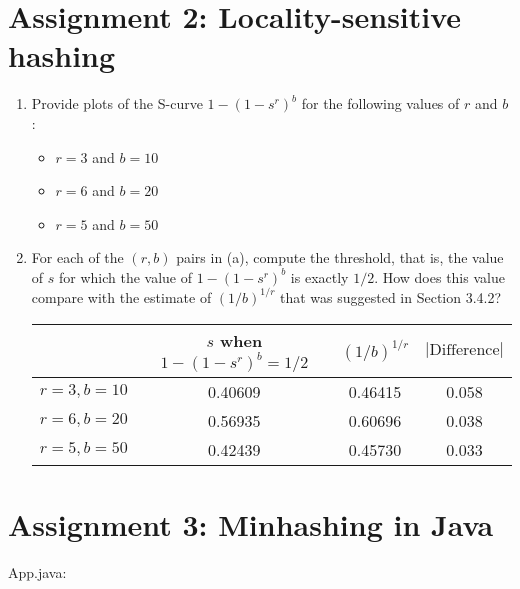 \documentclass{article}
\begin{document}
\section{Assignment 2: Locality-sensitive hashing}
\begin{enumerate}
\item{Provide plots of the S-curve $1-(1-s^r)^b$ for the following values of $r$ and $b$:
	\begin{itemize}
		\item{$r=3$ and $b=10$
			
		}
		\item{$r=6$ and $b=20$
			
		}
		\item{$r=5$ and $b=50$
			
		}
	\end{itemize}
}

\item{For each of the $(r,b)$ pairs in (a), compute the threshold, that is, the value of $s$ for which the value of $1-(1-s^r)^b$ is exactly $1/2$. How does this value compare with the estimate of $(1/b)^{1/r}$ that was suggested in Section 3.4.2?

\begin{center}
	\begin{tabular}{ c | c | c | c }
		           & \makecell{$s$ when \\ $1-(1-s^r)^b=1/2$} & $(1/b)^{1/r}$ & $|\text{Difference}|$ \\ \hline\hline
		$r=3,b=10$ & 0.40609                                  & 0.46415       & 0.058                  \\
		$r=6,b=20$ & 0.56935                                  & 0.60696       & 0.038                  \\
		$r=5,b=50$ & 0.42439                                  & 0.45730       & 0.033
	\end{tabular}
\end{center}
}
\end{enumerate}

\section{Assignment 3: Minhashing in Java}
App.java:
\inputminted[breaklines=true]{java}{java/Exercise4Assignment3/src/main/java/com/intelligent/data/management/Exercise4Assignment3/App.java}
\end{document}

